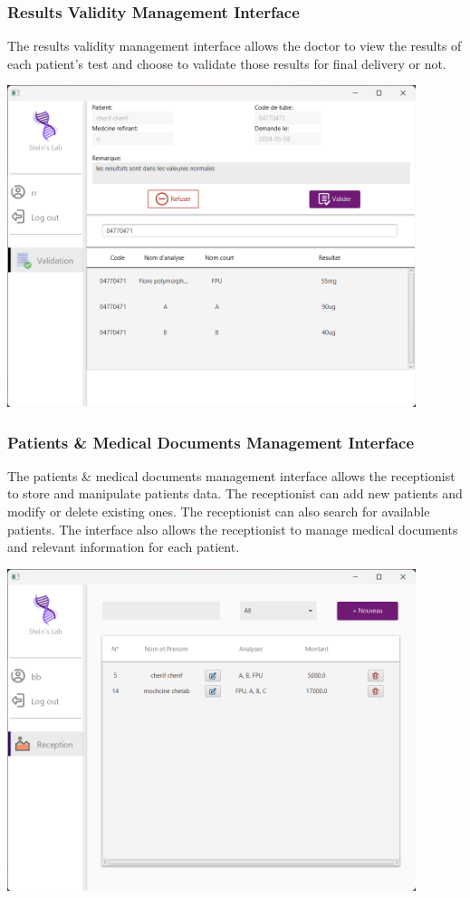 \documentclass{article}
\begin{document}
\newpage
\subsubsection*{Results Validity Management Interface}
The results validity management interface allows the doctor to view the results of each patient's test and choose to validate those results for final delivery or not.
\begin{center}
    \includegraphics[width=451px]{media/interface/validation.png}
\end{center}

\newpage
\subsubsection*{Patients \& Medical Documents Management Interface}
The patients \& medical documents management interface allows the receptionist to store and manipulate patients data. The receptionist can add new patients and modify or delete existing ones. The receptionist can also search for available patients.
The interface also allows the receptionist to manage medical documents and relevant information for each patient.
\begin{center}
    \includegraphics[width=451px]{media/interface/reception.png}
\end{center}
\end{document}

